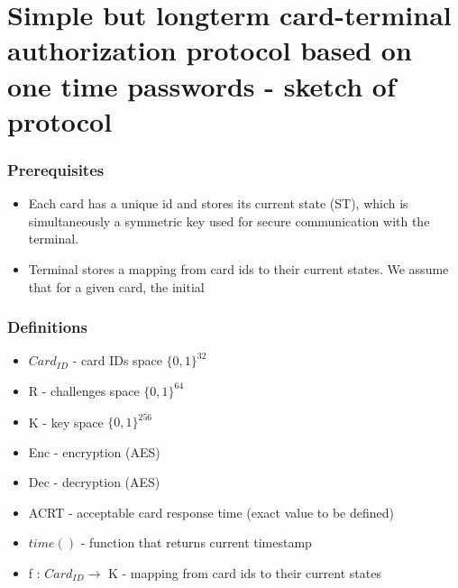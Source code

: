 \documentclass[10pt,titlepage]{article}
\begin{document}
\section*{Simple but longterm card-terminal authorization protocol based on one time passwords - sketch of protocol}

\subsubsection*{Prerequisites}

\begin{itemize}
	\item  Each card has a unique id and stores its current state (ST), which is simultaneously a symmetric key used for secure communication with the terminal.
	\item Terminal stores a mapping from card ids to their current states. We assume that for a given card, the initial
\end{itemize}

\subsubsection*{Definitions}

\begin{itemize}
	\item $Card_{ID}$  - card IDs space $\{0,1\}^{32}$
	\item R   - challenges space $\{0,1\}^{64}$
	\item K   - key space $\{0,1\}^{256}$ 
	\item Enc - encryption (AES)
	\item Dec - decryption (AES)
	\item ACRT - acceptable card response time (exact value to be defined)
	\item $time()$ - function that returns current timestamp
	\item f : $Card_{ID}  \rightarrow $ K - mapping from card ids to their current states
\end{itemize}
\end{document}
